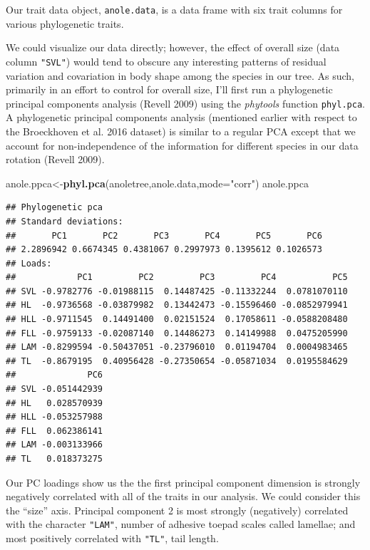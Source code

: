 \documentclass[fleqn,10pt,lineno]{wlpeerj} %
\newenvironment{Shaded}{\begin{snugshade}}{\end{snugshade}}
\newcommand{\AttributeTok}[1]{\textcolor[rgb]{0.13,0.29,0.53}{#1}}
\newcommand{\FunctionTok}[1]{\textcolor[rgb]{0.13,0.29,0.53}{\textbf{#1}}}
\newcommand{\NormalTok}[1]{#1}
\newcommand{\OtherTok}[1]{\textcolor[rgb]{0.56,0.35,0.01}{#1}}
\newcommand{\StringTok}[1]{\textcolor[rgb]{0.31,0.60,0.02}{#1}}
\begin{document}
Our trait data object, \texttt{anole.data}, is a data frame with six trait columns for various phylogenetic traits.

We could visualize our data directly; however, the effect of overall size (data column \texttt{"SVL"}) would tend to obscure any interesting patterns of residual variation and covariation in body shape among the species in our tree. As such, primarily in an effort to control for overall size, I'll first run a phylogenetic principal components analysis (Revell 2009) using the \emph{phytools} function \texttt{phyl.pca}. A phylogenetic principal components analysis (mentioned earlier with respect to the Broeckhoven et al. 2016 dataset) is similar to a regular PCA except that we account for non-independence of the information for different species in our data rotation (Revell 2009).

\begin{Shaded}
\begin{Highlighting}[]
\NormalTok{anole.ppca}\OtherTok{\textless{}{-}}\FunctionTok{phyl.pca}\NormalTok{(anoletree,anole.data,}\AttributeTok{mode=}\StringTok{"corr"}\NormalTok{)}
\NormalTok{anole.ppca}
\end{Highlighting}
\end{Shaded}

\begin{verbatim}
## Phylogenetic pca
## Standard deviations:
##       PC1       PC2       PC3       PC4       PC5       PC6 
## 2.2896942 0.6674345 0.4381067 0.2997973 0.1395612 0.1026573 
## Loads:
##            PC1         PC2         PC3         PC4           PC5
## SVL -0.9782776 -0.01988115  0.14487425 -0.11332244  0.0781070110
## HL  -0.9736568 -0.03879982  0.13442473 -0.15596460 -0.0852979941
## HLL -0.9711545  0.14491400  0.02151524  0.17058611 -0.0588208480
## FLL -0.9759133 -0.02087140  0.14486273  0.14149988  0.0475205990
## LAM -0.8299594 -0.50437051 -0.23796010  0.01194704  0.0004983465
## TL  -0.8679195  0.40956428 -0.27350654 -0.05871034  0.0195584629
##              PC6
## SVL -0.051442939
## HL   0.028570939
## HLL -0.053257988
## FLL  0.062386141
## LAM -0.003133966
## TL   0.018373275
\end{verbatim}

Our PC loadings show us the the first principal component dimension is strongly negatively correlated with all of the traits in our analysis. We could consider this the ``size'' axis. Principal component 2 is most strongly (negatively) correlated with the character \texttt{"LAM"}, number of adhesive toepad scales called lamellae; and most positively correlated with \texttt{"TL"}, tail length.
\end{document}
